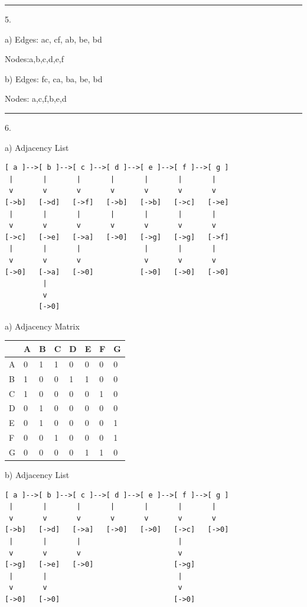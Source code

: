 \documentclass{article}
\begin{document}
\noindent\rule{8cm}{0.4pt}

5. 

a) Edges: ac, cf, ab, be, bd
	
	Nodes:a,b,c,d,e,f

b) Edges: fc, ca, ba, be, bd
	
	Nodes:  a,c,f,b,e,d


\noindent\rule{8cm}{0.4pt}

6. 

a) Adjacency List

\begin{lstlisting}
[ a ]-->[ b ]-->[ c ]-->[ d ]-->[ e ]-->[ f ]-->[ g ]
 |       |       |       |       |       |       | 
 v       v       v       v       v       v       v
[->b]   [->d]   [->f]   [->b]   [->b]   [->c]   [->e]
 |       |       |       |       |       |       | 
 v       v       v       v       v       v       v
[->c]   [->e]   [->a]   [->0]   [->g]   [->g]   [->f]
 |       |       |               |       |       | 
 v       v       v               v       v       v
[->0]   [->a]   [->0]           [->0]   [->0]   [->0]
         |
         v
        [->0] 
\end{lstlisting}


a) Adjacency Matrix

\begin{table}[H]
\begin{tabular}{l|l|l|l|l|l|l|l|}
\cline{2-8}
 & A & B & C & D & E & F & G \\ \hline
\multicolumn{1}{|l|}{A} & 0 & 1 & 1 & 0 & 0 & 0 & 0 \\ \hline
\multicolumn{1}{|l|}{B} & 1 & 0 & 0 & 1 & 1 & 0 & 0 \\ \hline
\multicolumn{1}{|l|}{C} & 1 & 0 & 0 & 0 & 0 & 1 & 0 \\ \hline
\multicolumn{1}{|l|}{D} & 0 & 1 & 0 & 0 & 0 & 0 & 0 \\ \hline
\multicolumn{1}{|l|}{E} & 0 & 1 & 0 & 0 & 0 & 0 & 1 \\ \hline
\multicolumn{1}{|l|}{F} & 0 & 0 & 1 & 0 & 0 & 0 & 1 \\ \hline
\multicolumn{1}{|l|}{G} & 0 & 0 & 0 & 0 & 1 & 1 & 0 \\ \hline
\end{tabular}
\end{table}


b) Adjacency List

\begin{lstlisting}
[ a ]-->[ b ]-->[ c ]-->[ d ]-->[ e ]-->[ f ]-->[ g ]
 |       |       |       |       |       |       | 
 v       v       v       v       v       v       v
[->b]   [->d]   [->a]   [->0]   [->0]   [->c]   [->0]
 |       |       |                       |     
 v       v       v                       v    
[->g]   [->e]   [->0]                   [->g]
 |       |                               |  
 v       v                               v   
[->0]   [->0]                           [->0]

\end{lstlisting}
\end{document}
